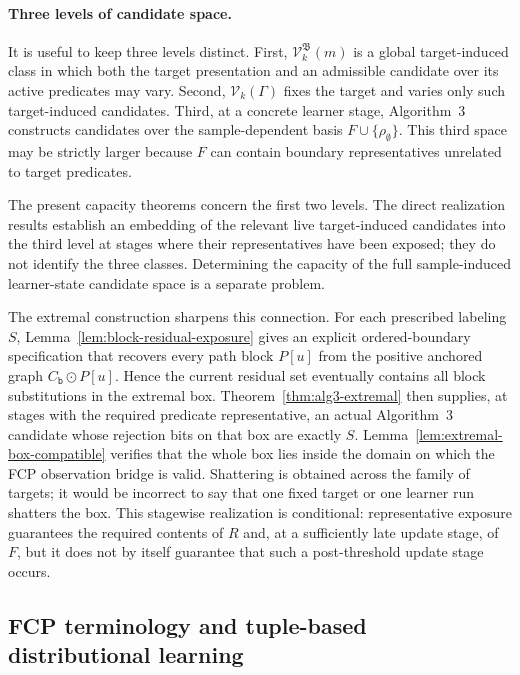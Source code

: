 \documentclass[11pt]{article}
\theoremstyle{definition}
\theoremstyle{remark}
\begin{document}
\paragraph{Three levels of candidate space.}
It is useful to keep three levels distinct.  First,
\(\mathcal V_k^{\mathfrak B}(m)\) is a global target-induced class in which
both the target presentation and an admissible candidate over its active
predicates may vary.  Second, \(\mathcal V_k(\Gamma)\) fixes the target and
varies only such target-induced candidates.  Third, at a concrete learner
stage, Algorithm~3 constructs candidates over the sample-dependent basis
\(F\cup\{\rho_\emptyset\}\).  This third space may be strictly larger because
\(F\) can contain boundary representatives unrelated to target predicates.

The present capacity theorems concern the first two levels.  The direct
realization results establish an embedding of the relevant live
target-induced candidates into the third level at stages where their
representatives have been exposed; they do not identify the three classes.
Determining the capacity of the full sample-induced learner-state candidate
space is a separate problem.

The extremal construction sharpens this connection.  For each prescribed
labeling \(S\), Lemma~\ref{lem:block-residual-exposure} gives an explicit
ordered-boundary specification that recovers every path block \(P[u]\) from
the positive anchored graph \(C_{\mathtt b}\odot P[u]\).  Hence the current
residual set eventually contains all block substitutions in the extremal box.
Theorem~\ref{thm:alg3-extremal} then supplies, at stages with the required
predicate representative, an actual Algorithm~3 candidate whose rejection
bits on that box are exactly \(S\).  Lemma~\ref{lem:extremal-box-compatible}
verifies that the whole box lies inside the domain on which the FCP observation
bridge is valid.  Shattering is obtained across the family of targets; it
would be incorrect to say that one fixed target or one learner run shatters
the box.
This stagewise realization is conditional: representative exposure guarantees
the required contents of \(R\) and, at a sufficiently late update stage, of
\(F\), but it does not by itself guarantee that such a post-threshold update
stage occurs.

\subsection{FCP terminology and tuple-based distributional learning}
\end{document}
